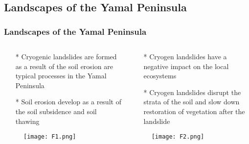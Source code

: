 \documentclass[pdflatex,compress,9pt,
	xcolor={dvipsnames,dvipsnames,svgnames,x11names,table},
	hyperref={colorlinks = true,breaklinks = true, urlcolor = NavyBlue, breaklinks = true}]{beamer}
\begin{document}
\subsection{Landscapes of the Yamal Peninsula} 
\begin{frame}\frametitle{Landscapes of the Yamal Peninsula}
\begin{minipage}[0.4\textheight]{\textwidth}
\begin{columns}[T]
\begin{column}{0.5\textwidth}
\begin{itemize}
       \item[*] Cryogenic landslides are formed as a result of the soil erosion are typical processes in the Yamal Peninsula
       \item[*] Soil erosion develop as a result of the soil subsidence and soil thawing
\end{itemize}
\begin{figure}[H]
	\centering
		\texttt{[image: F1.png]}
\end{figure}
\end{column}
\begin{column}{0.5\textwidth}
\begin{itemize}
       \item[*] Cryogen landslides have a negative impact on the local ecosystems
       \item[*] Cryogen landslides disrupt the strata of the soil and slow down restoration of vegetation after the landslide
\end{itemize}
\begin{figure}[H]
	\centering
		\texttt{[image: F2.png]}
\end{figure}
\end{column}
\end{columns}
\end{minipage}
\end{frame}
\end{document}
